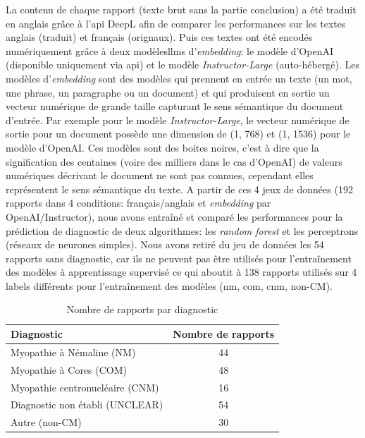 La contenu de chaque rapport (texte brut sans la partie conclusion) a été traduit en anglais grâce à l'\gls{api} DeepL afin de comparer les performances sur les textes anglais (traduit) et français (orignaux). Puis ces textes ont été encodés numériquement grâce à deux modèles\gls{llms} d'\textit{embedding}: le modèle d'OpenAI (disponible uniquement via \gls{api}) et le modèle \textit{Instructor-Large} (auto-hébergé). Les modèles d'\textit{embedding} sont des modèles qui prennent en entrée un texte (un mot, une phrase, un paragraphe ou un document) et qui produisent en sortie un vecteur numérique de grande taille capturant le sens sémantique du document d'entrée. Par exemple pour le modèle \textit{Instructor-Large}, le vecteur numérique de sortie pour un document possède une dimension de (1, 768) et (1, 1536) pour le modèle d'OpenAI. Ces modèles sont des boites noires, c'est à dire que la signification des centaines (voire des milliers dans le cas d'OpenAI) de valeurs numériques décrivant le document ne sont pas connues, cependant elles représentent le sens sémantique du texte.
A partir de ces 4 jeux de données (192 rapports dans 4 conditions: français/anglais et \textit{embedding} par OpenAI/Instructor), nous avons entraîné et comparé les performances pour la prédiction de diagnostic de deux algorithmes: les \textit{random forest} et les perceptrons (réseaux de neurones simples). Nous avons retiré du jeu de données les 54 rapports sans diagnostic, car ils ne peuvent pas être utilisés pour l'entraînement des modèles à apprentissage supervisé ce qui aboutit à 138 rapports utilisés sur 4 labels différents pour l'entraînement des modèles (\gls{nm}, \gls{com}, \gls{cnm}, non-CM).
\begin{table}[!ht]
\centering
\caption{Nombre de rapports par diagnostic}
\label{tab:number_patients}
\begin{tabular}{|l|c|}
\hline
\textbf{Diagnostic} & \textbf{Nombre de rapports} \\
\hline
Myopathie à Némaline (NM) & 44 \\
\hline
Myopathie à Cores (COM) & 48 \\
\hline
Myopathie centronucléaire (CNM) & 16 \\
\hline
Diagnostic non établi (UNCLEAR) & 54 \\
\hline
Autre (non-CM) & 30 \\
\hline
\end{tabular}
\end{table}


